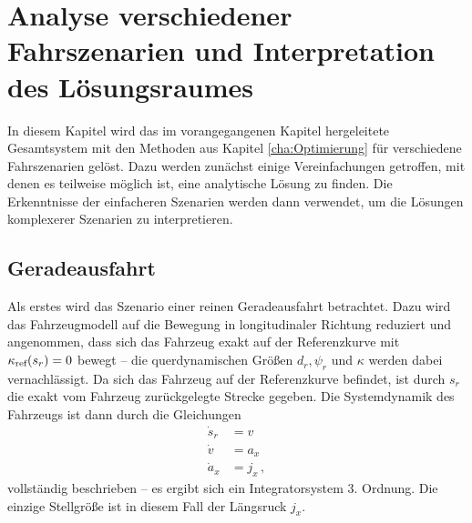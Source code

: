 \chapter{Analyse verschiedener Fahrszenarien und Interpretation des Lösungsraumes}\label{cha:Ergebnisse}
In diesem Kapitel wird das im vorangegangenen Kapitel hergeleitete Gesamtsystem mit den Methoden aus Kapitel \ref{cha:Optimierung} für verschiedene Fahrszenarien gelöst. Dazu werden zunächst einige Vereinfachungen getroffen, mit denen es teilweise möglich ist, eine analytische Lösung zu finden. Die Erkenntnisse der einfacheren Szenarien werden dann verwendet, um die Lösungen komplexerer Szenarien zu interpretieren. 

\section{Geradeausfahrt}\label{sec:Geradeausfahrt}
Als erstes wird das Szenario einer reinen Geradeausfahrt betrachtet. Dazu wird das Fahrzeugmodell auf die Bewegung in longitudinaler Richtung reduziert und angenommen, dass sich das Fahrzeug exakt auf der Referenzkurve mit $\kappa_{\textrm{ref}}(s_r) = 0$ bewegt -- die querdynamischen Größen $d_r, \psi_r$ und $\kappa$ werden dabei vernachlässigt. Da sich das Fahrzeug auf der Referenzkurve befindet, ist durch $s_r$ die exakt vom Fahrzeug zurückgelegte Strecke gegeben. Die Systemdynamik des Fahrzeugs ist dann durch die Gleichungen 
\begin{align}
\dot{s}_r &= v \\
\dot{v} &= a_x \\
\dot{a}_x &= j_x \,,
\end{align}
vollständig beschrieben -- es ergibt sich ein Integratorsystem 3. Ordnung. Die einzige Stellgröße ist in diesem Fall der Längsruck $j_x$.

